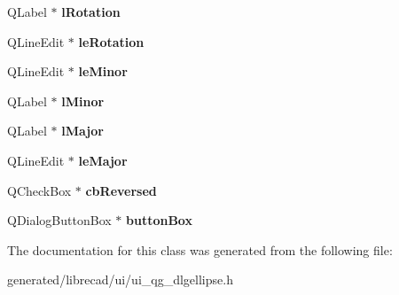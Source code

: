\begin{DoxyCompactItemize}
\item 
\hypertarget{classUi__QG__DlgEllipse_a5f2d4b984e2e88fee3740acd59155725}{Q\-Label $\ast$ {\bfseries l\-Rotation}}\label{classUi__QG__DlgEllipse_a5f2d4b984e2e88fee3740acd59155725}

\item 
\hypertarget{classUi__QG__DlgEllipse_ad9b62c58ac66c688669d74e820374ab9}{Q\-Line\-Edit $\ast$ {\bfseries le\-Rotation}}\label{classUi__QG__DlgEllipse_ad9b62c58ac66c688669d74e820374ab9}

\item 
\hypertarget{classUi__QG__DlgEllipse_a48526e47128e599a318a70cd93fc14c8}{Q\-Line\-Edit $\ast$ {\bfseries le\-Minor}}\label{classUi__QG__DlgEllipse_a48526e47128e599a318a70cd93fc14c8}

\item 
\hypertarget{classUi__QG__DlgEllipse_aca68c0e9dfebb8bca8ccfc469eca4a03}{Q\-Label $\ast$ {\bfseries l\-Minor}}\label{classUi__QG__DlgEllipse_aca68c0e9dfebb8bca8ccfc469eca4a03}

\item 
\hypertarget{classUi__QG__DlgEllipse_a9fcb4c3a8326273b23026da62a411584}{Q\-Label $\ast$ {\bfseries l\-Major}}\label{classUi__QG__DlgEllipse_a9fcb4c3a8326273b23026da62a411584}

\item 
\hypertarget{classUi__QG__DlgEllipse_a55e36e8b2fe80e87940965c14ca2c0f0}{Q\-Line\-Edit $\ast$ {\bfseries le\-Major}}\label{classUi__QG__DlgEllipse_a55e36e8b2fe80e87940965c14ca2c0f0}

\item 
\hypertarget{classUi__QG__DlgEllipse_a6bb0afa78355d57bb5c4dbc4f4b52f36}{Q\-Check\-Box $\ast$ {\bfseries cb\-Reversed}}\label{classUi__QG__DlgEllipse_a6bb0afa78355d57bb5c4dbc4f4b52f36}

\item 
\hypertarget{classUi__QG__DlgEllipse_aaf9e640cc070b9157e4295f89968e868}{Q\-Dialog\-Button\-Box $\ast$ {\bfseries button\-Box}}\label{classUi__QG__DlgEllipse_aaf9e640cc070b9157e4295f89968e868}

\end{DoxyCompactItemize}


The documentation for this class was generated from the following file\-:\begin{DoxyCompactItemize}
\item 
generated/librecad/ui/ui\-\_\-qg\-\_\-dlgellipse.\-h\end{DoxyCompactItemize}
